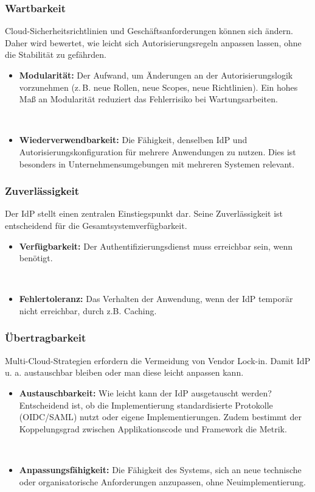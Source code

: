 \subsubsection{Wartbarkeit}

Cloud-Sicherheitsrichtlinien und Geschäftsanforderungen können sich ändern. Daher wird bewertet, wie leicht sich Autorisierungsregeln anpassen lassen, ohne die Stabilität zu gefährden.

\begin{itemize}
    \item \textbf{Modularität:} Der Aufwand, um Änderungen an der Autorisierungslogik vorzunehmen (z.\,B. neue Rollen, neue Scopes, neue Richtlinien). Ein hohes Maß an Modularität reduziert das Fehlerrisiko bei Wartungsarbeiten.

    \item \textbf{Wiederverwendbarkeit:} Die Fähigkeit, denselben \ac{IdP} und Autorisierungskonfiguration für mehrere Anwendungen zu nutzen. Dies ist besonders in Unternehmensumgebungen mit mehreren Systemen relevant.
\end{itemize}

\subsubsection{Zuverlässigkeit}

Der \ac{IdP} stellt einen zentralen Einstiegspunkt dar. Seine Zuverlässigkeit ist entscheidend für die Gesamtsystemverfügbarkeit.

\begin{itemize}
    \item \textbf{Verfügbarkeit:} Der Authentifizierungsdienst muss erreichbar sein, wenn benötigt.

    \item \textbf{Fehlertoleranz:} Das Verhalten der Anwendung, wenn der \ac{IdP} temporär nicht erreichbar, durch z.B. Caching.
\end{itemize}

\subsubsection{Übertragbarkeit}

Multi-Cloud-Strategien erfordern die Vermeidung von Vendor Lock-in. Damit \ac{IdP} u. a. austauschbar bleiben oder man diese leicht anpassen kann.

\begin{itemize}
    \item \textbf{Austauschbarkeit:} Wie leicht kann der \ac{IdP} ausgetauscht werden? Entscheidend ist, ob die Implementierung standardisierte Protokolle (\ac{OIDC}/\ac{SAML}) nutzt oder eigene Implementierungen. Zudem bestimmt der Koppelungsgrad zwischen Applikationscode und Framework die Metrik.

    \item \textbf{Anpassungsfähigkeit:} Die Fähigkeit des Systems, sich an neue technische oder organisatorische Anforderungen anzupassen, ohne Neuimplementierung.
\end{itemize}

